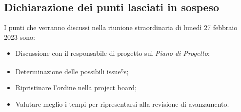 \subsection{Dichiarazione dei punti lasciati in sospeso}
 I punti che verranno discussi nella riunione straordinaria di lunedì 27 febbraio 2023 sono:
 \begin{itemize}
    \item Discussione con il responsabile di progetto sul \textit{Piano di Progetto};
    \item Determinazione delle possibili issue\textsuperscript{g}s;
    \item Ripristinare l'ordine nella project board;
    \item Valutare meglio i tempi per ripresentarsi alla revisione di avanzamento.
 \end{itemize}